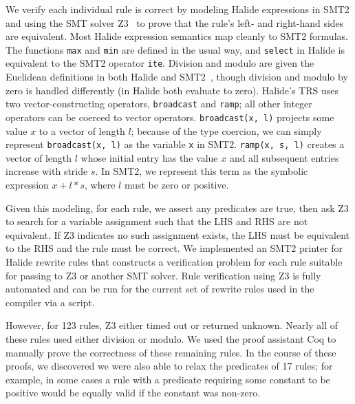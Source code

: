 \documentclass[acmsmall,review,anonymous]{acmart}\settopmatter{printfolios=true,printccs=false,printacmref=false}
\newcommand{\NumPredicatesRelaxed}{{\color{black} 17}\xspace}
\begin{document}
We verify each individual rule is correct by modeling Halide
expressions in SMT2 and using the SMT solver Z3~\cite{de2008z3} to
prove that the rule's left- and right-hand sides are equivalent. Most Halide expression
semantics map cleanly to SMT2 formulas. The functions \texttt{max} and
\texttt{min} are defined in the usual way, and \texttt{select} in
Halide is equivalent to the SMT2 operator \texttt{ite}. Division and
modulo are given the Euclidean definitions in both Halide and
SMT2~\cite{boute1992euclidean}, though division and modulo by zero is handled
differently (in Halide both evaluate to zero).
Halide's TRS uses two vector-constructing operators, \texttt{broadcast} and \texttt{ramp}; all
other integer operators can be coerced to vector operators. 
\texttt{broadcast(x, l)} projects some value $x$ to a vector of length $l$; because of
the type coercion, we can simply represent \texttt{broadcast(x, l)} as the variable
\texttt{x} in SMT2. \texttt{ramp(x, s, l)} creates a vector of length $l$
whose initial entry has the value $x$ and all subsequent entries increase with
stride $s$. In SMT2, we represent this term as the symbolic expression $x + l *
s$, where $l$ must be zero or positive.

Given this modeling, for each rule, we assert any predicates are true, then
ask Z3 to search for a variable assignment such that the LHS and RHS are not
equivalent.  If Z3 indicates no such assignment exists, the LHS must be equivalent to
the RHS and the rule must be correct. We implemented an SMT2 printer for 
Halide rewrite rules that constructs a verification problem for each rule
suitable for passing to Z3 or another SMT solver.  Rule verification using Z3 is fully automated
and can be run for the current set of rewrite rules used in the compiler via a script.

However, for 123
rules, Z3 either timed out or returned unknown. Nearly all of these rules used
either division or modulo. We used the proof assistant Coq to manually prove the
correctness of these remaining rules. In the course of these proofs, we
discovered we were also able to relax the predicates of \NumPredicatesRelaxed
rules; for example, in some cases a rule
with a predicate requiring some constant to be positive would be equally valid
if the constant was non-zero.
\end{document}
